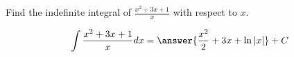 \documentclass{ximera}
\author{Gregory Hartman \and Matthew Carr}
\begin{document}
\begin{exercise}

Find the indefinite integral of $\frac{x^2+3 x+1}{x}$ with respect to $x$.

\[
\int \frac{x^2+3 x+1}{x} dx=\answer{\frac{x^2}{2}+3 x+\ln|x|}+C
\]

\end{exercise}
\end{document}
